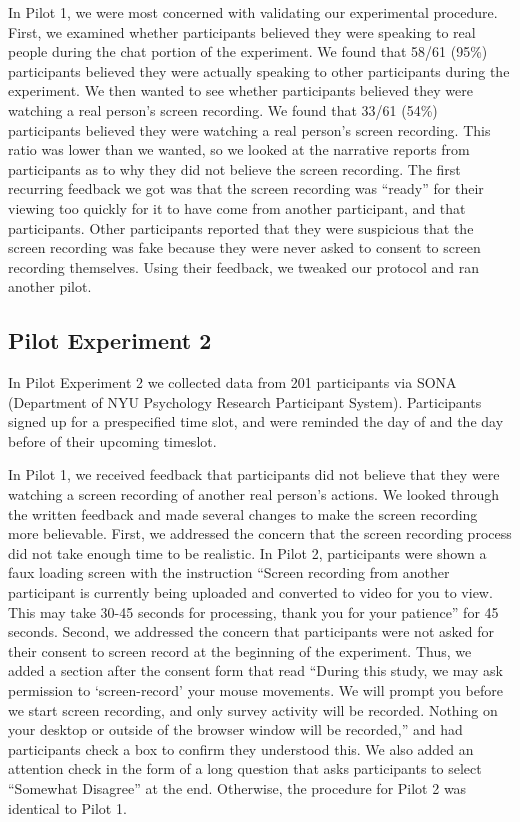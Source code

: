 \documentclass[12pt,]{article}
\begin{document}
In Pilot 1, we were most concerned with validating our experimental procedure. First, we examined whether participants believed they were speaking to real people during the chat portion of the experiment. We found that 58/61 (95\%) participants believed they were actually speaking to other participants during the experiment. We then wanted to see whether participants believed they were watching a real person’s screen recording. We found that 33/61 (54\%) participants believed they were watching a real person’s screen recording. This ratio was lower than we wanted, so we looked at the narrative reports from participants as to why they did not believe the screen recording. The first recurring feedback we got was that the screen recording was “ready” for their viewing too quickly for it to have come from another participant, and that participants. Other participants reported that they were suspicious that the screen recording was fake because they were never asked to consent to screen recording themselves. Using their feedback, we tweaked our protocol and ran another pilot. 

 \subsection{Pilot Experiment 2}
\label{appendix:px2}

In Pilot Experiment 2 we collected data from 201 participants via SONA (Department of NYU Psychology Research Participant System). Participants signed up for a prespecified time slot, and were reminded the day of and the day before of their upcoming timeslot.

In Pilot 1, we received feedback that participants did not believe that they were watching a screen recording of another real person’s actions. We looked through the written feedback and made several changes to make the screen recording more believable. First, we addressed the concern that the screen recording process did not take enough time to be realistic. In  Pilot 2, participants were shown a faux loading screen with the instruction “Screen recording from another participant is currently being uploaded and converted to video for you to view. This may take 30-45 seconds for processing, thank you for your patience” for 45 seconds.  Second, we addressed the concern that participants were not asked for their consent to screen record at the beginning of the experiment.  Thus, we added a section after the consent form that read “During this study, we may ask permission to ‘screen-record’ your mouse movements. We will prompt you before we start screen recording, and only survey activity will be recorded. Nothing on your desktop or outside of the browser window will be recorded,” and had participants check a box to confirm they understood this. We also added an attention check in the form of a long question that asks participants to select “Somewhat Disagree” at the end. Otherwise, the procedure for Pilot 2 was identical to Pilot 1.
\end{document}
